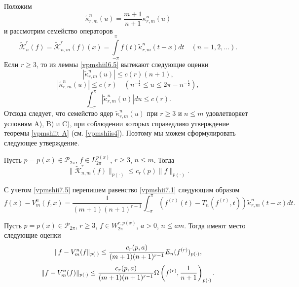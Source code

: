 Положим
\begin{equation}\label{vpmshii7.5}
    \tilde\kappa_{r,m}^{n}(u)= \frac{m+1}{n+1}\kappa_{r,m}^{n}(u)
\end{equation}
и рассмотрим семейство операторов
\begin{equation}\label{vpmshii7.6}
    \tilde{\mathcal{K}}_n^r(f)=\tilde{\mathcal{K}}_{n,m}^r(f)(x)=
\int\limits_{-\pi}^{\pi}f(t)\tilde\kappa_{r,m}^{n}(t-x)dt\quad(n=1,2,\ldots).
\end{equation}
Если $r\ge3$, то из леммы \ref{vpmshiil6.5} вытекают следующие оценки
 $$
 |\tilde\kappa_{r,m}^{n}(u)|\le c(r)(n+1),
 $$
$$
 |\tilde\kappa_{r,m}^{n}(u)|\le c(r) \quad (n^{-\frac12}\le u\le2\pi-n^{-\frac12}),
 $$
$$
\int_{-\pi}^\pi |\tilde\kappa_{r,m}^{n}(u)|du \le c(r).
$$
Отсюда следует, что семейство ядер $\tilde\kappa_{r,m}^{n}(u)$ при $r\ge3$ и $n\le m$ удовлетворяет условиям A), B) и C), при соблюдении
которых справедливо утверждение теоремы \ref{vpmshiit A} (см. \ref{vpmshiis4}). Поэтому мы можем сформулировать следующее утверждение.
\begin{lemma}\label{vpmshiil7.1}
 Пусть $p=p(x)\in\mathcal{ P}_{2\pi}$, $f\in L^{p(x)}_{2\pi}$, $r\ge3$, $n\le m$. Тогда
$$\|\tilde{\mathcal{ K}}_{n,m}^r(f)\|_{p(\cdot)}\le c_r(p)\|f\|_{p(\cdot)}.$$
  \end{lemma}
С учетом \ref{vpmshii7.5} перепишем   равенство \eqref{vpmshii7.1} следующим образом
\begin{equation}\label{vpmshii7.7}
  f(x)-V_m^n(f,x)= \frac{1}{(m+1)(n+1)^{r-1}}\int_{-\pi}^\pi (f^{(r)}(t)-T_n(f^{(r)},t))\tilde\kappa_{r,m}^n(t-x)dt.
\end{equation}

\begin{theorem}\label{vpmshiit3}
Пусть  $p=p(x)\in\mathcal{  P}_{2\pi}$, $r\ge3$, $f\in W^{r,p(x)}_{2\pi}$, $a>0$, $ n\le am$. Тогда имеют место следующие оценки
\begin{equation}\label{vpmshii7.8}
   \|f-V_m^n(f\|_{p(\cdot)}\le {c_r(p,a)\over(m+1) (n+1)^{r-1}}E_n(f^{(r)})_{p(\cdot)},
\end{equation}
\begin{equation}\label{vpmshii7.9}
   \|f-V_m^n(f)\|_{p(\cdot)}\le {c_r(p,a)\over(m+1) (n+1)^{r-1}}\Omega\left(f^{(r)},\frac1{n+1}\right)_{p(\cdot)}.
\end{equation}
\end{theorem}

